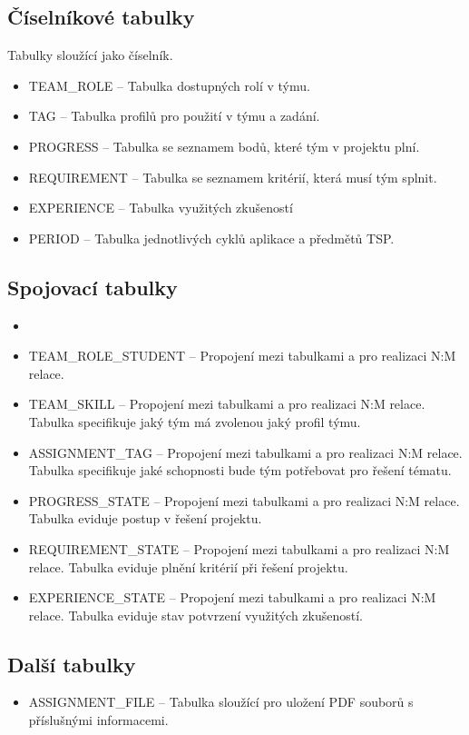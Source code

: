 \documentclass[czech,BP]{thesiskiv}
\begin{document}
		\subsection{Číselníkové tabulky}
		\par Tabulky sloužící jako číselník.
		\begin{itemize}
			\item TEAM\_ROLE -- Tabulka dostupných rolí v týmu.
			\item TAG -- Tabulka profilů pro použití v týmu a zadání.
			\item PROGRESS -- Tabulka se seznamem bodů, které tým v projektu plní.
			\item REQUIREMENT -- Tabulka se seznamem kritérií, která musí tým splnit.
			\item EXPERIENCE -- Tabulka využitých zkušeností
			\item PERIOD -- Tabulka jednotlivých cyklů aplikace a předmětů TSP.
		\end{itemize}
		\subsection{Spojovací tabulky}
			\begin{itemize}
				\item
				\item TEAM\_ROLE\_STUDENT -- Propojení mezi tabulkami  a  pro realizaci N:M relace. 
				\item TEAM\_SKILL -- Propojení mezi tabulkami  a  pro realizaci N:M relace. Tabulka specifikuje jaký tým má zvolenou jaký profil týmu.
				\item ASSIGNMENT\_TAG -- Propojení mezi tabulkami  a  pro realizaci N:M relace. Tabulka specifikuje jaké schopnosti bude tým potřebovat pro řešení tématu.
				\item PROGRESS\_STATE -- Propojení mezi tabulkami  a  pro realizaci N:M relace. Tabulka eviduje postup v řešení projektu.
				\item REQUIREMENT\_STATE -- Propojení mezi tabulkami  a  pro realizaci N:M relace. Tabulka eviduje plnění kritérií při řešení projektu.
				\item EXPERIENCE\_STATE -- Propojení mezi tabulkami  a  pro realizaci N:M relace. Tabulka eviduje stav potvrzení využitých zkušeností.
			\end{itemize}
		\subsection{Další tabulky}
			\begin{itemize}
				\item ASSIGNMENT\_FILE -- Tabulka sloužící pro uložení PDF souborů s příslušnými informacemi.
			\end{itemize}
\end{document}
